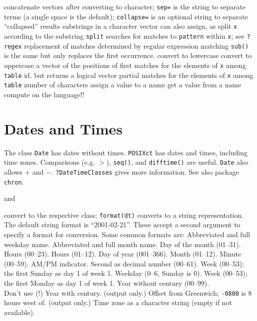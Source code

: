 	{concatenate vectors after converting to character; {\tt sep=} is the string to separate terms (a single space is the default); {\tt collapse=} is an optional string to separate ``collapsed'' results}
	{substrings in a character vector}
	{can also assign, as}
	{split {\tt x} according to the substring {\tt split}}
	{searches for matches to {\tt pattern} within {\tt x}; see {\tt ?regex}}
	{replacement of matches determined by regular expression matching {\tt sub()} is the same but only replaces the first occurrence.}
	{convert to lowercase}
	{convert to uppercase}
	{a vector of the positions of first matches for the elements of {\tt x} among {\tt table}}
	{id. but returns a logical vector}
	{partial matches for the elements of {\tt x} among {\tt table}}
	{number of characters}
	{assign a value to a name}
	{get a value from a name}
	{compute on the language!!}

\section{Dates and Times}{
The class {\tt Date} has dates without times.  {\tt POSIXct} has
dates and times, including time zones. Comparisons (e.g. $>$),
{\tt seq()}, and {\tt difftime()} are useful. {\tt Date} also allows
$+$ and $-$. {\tt ?DateTimeClasses} gives more information. See also package
{\tt chron}.}

	{and}

	{convert to the respective class; {\tt format(dt)} converts to a string representation. The default string format is ``2001-02-21''. These accept a second argument to specify a format for conversion. Some common formats are:}
	{Abbreviated and full \\weekday name.}
	{Abbreviated and full month name.}
	{Day of the month (01--31).}
	{Hours (00--23).}
	{Hours (01--12).}
	{Day of year (001--366).}
	{Month (01--12).}
	{Minute (00--59).}
	{AM/PM indicator. }
	{Second as decimal number (00--61).}
	{Week (00--53); the first Sunday as day 1 of week 1.}
	{Weekday (0--6, Sunday is 0).}
	{Week (00--53); the first Monday as day 1 of week 1.}
	{Year without century (00--99).\\Don't use (!)}
	{Year with century.}
	{(output only.) Offset from Greenwich; {\tt -0800} is 8 hours west of.}
	{(output only.) Time zone as a character
    string (empty if not available).}

